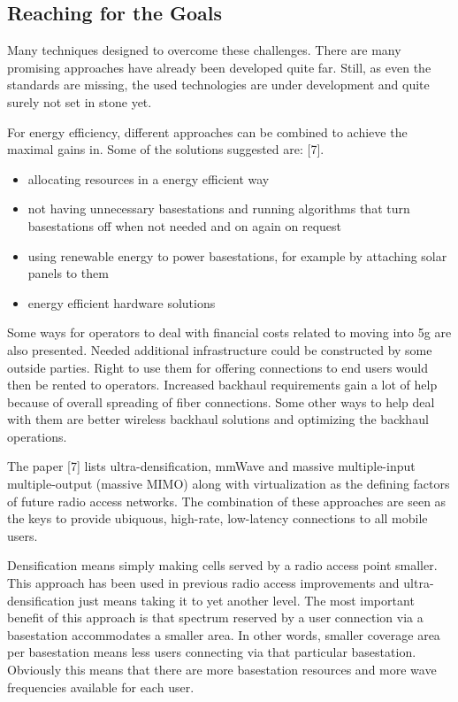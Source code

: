\documentclass[conference]{IEEEtran}
\begin{document}
\subsection{Reaching for the Goals}
Many techniques designed to overcome these challenges. There are many promising approaches have already been developed quite far. Still, as even the standards are missing, the used technologies are under development and quite surely not set in stone yet.
\par
For energy efficiency, different approaches can be combined to achieve the maximal gains in. Some of the solutions suggested are: [7].
\begin{itemize}
\item allocating resources in a energy efficient way
\item not having unnecessary basestations and running algorithms that turn basestations off when not needed and on again on request
\item using renewable energy to power basestations, for example by attaching solar panels to them
\item energy efficient hardware solutions
\end{itemize}
\par
Some ways for operators to deal with financial costs related to moving into 5g are also presented. Needed additional infrastructure could be constructed by some outside parties. Right to use them for offering connections to end users would then be rented to operators. Increased backhaul requirements gain a lot of help because of overall spreading of fiber connections. Some other ways to help deal with them are better wireless backhaul solutions and optimizing the backhaul operations.
\par
The paper [7] lists ultra-densification, mmWave and massive multiple-input multiple-output (massive MIMO) along with virtualization as the defining factors of future radio access networks. The combination of these approaches are seen as the keys to provide ubiquous, high-rate, low-latency connections to all mobile users.
\par
Densification means simply making cells served by a radio access point smaller. This approach has been used in previous radio access improvements and ultra-densification just means taking it to yet another level. The most important benefit of this approach is that spectrum reserved by a user connection via a basestation accommodates a smaller area. In other words, smaller coverage area per basestation means less users connecting via that particular basestation. Obviously this means that there are more basestation resources and more wave frequencies available for each user.
\end{document}
